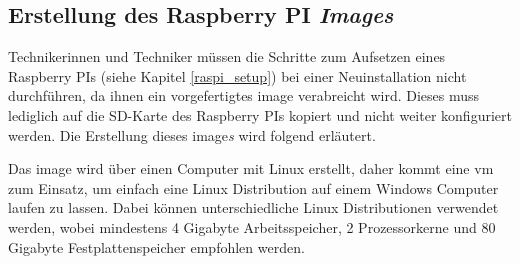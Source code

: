 \subsection{Erstellung des Raspberry PI \textit{Images}}
Technikerinnen und Techniker müssen die Schritte zum Aufsetzen eines Raspberry PIs (siehe Kapitel \ref{raspi_setup}) bei einer Neuinstallation nicht durchführen, da ihnen ein vorgefertigtes \gls{image} verabreicht wird. Dieses muss lediglich auf die SD-Karte des Raspberry PIs kopiert und nicht weiter konfiguriert werden. Die Erstellung dieses \gls{image}\textit{s} wird folgend erläutert.

Das \gls{image} wird über einen Computer mit Linux erstellt, daher kommt eine \ac{vm} zum Einsatz, um einfach eine Linux Distribution auf einem Windows Computer laufen zu lassen. Dabei können unterschiedliche Linux Distributionen verwendet werden, wobei mindestens 4 Gigabyte Arbeitsspeicher, 2 Prozessorkerne und 80 Gigabyte Festplattenspeicher empfohlen werden. 

